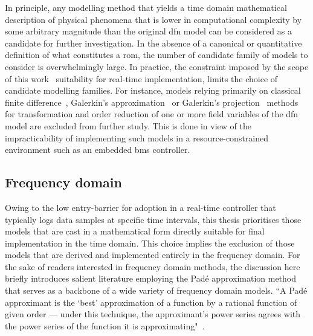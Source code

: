 \addlines[-0.5]
In  principle, any  modelling  method  that yields  a  time domain  mathematical
description  of physical  phenomena that  is lower  in computational  complexity
by  some  arbitrary   magnitude  than  the  original  \gls{dfn}   model  can  be
considered  as  a  candidate  for  further  investigation.  In  the  absence  of
a  canonical  or  quantitative  definition  of  what  constitutes  a  \gls{rom},
the  number  of  candidate  family  of  models  to  consider  is  overwhelmingly
large.  In  practice,  the  constraint  imposed   by  the  scope  of  this  work
\ie~suitability  for real-time  implementation, limits  the choice  of candidate
modelling  families.  For  instance,   models  relying  primarily  on  classical
finite  difference~\cite{Smith2006}, Galerkin's  approximation~\cite{Dao2012} or
Galerkin's  projection~\cite{Fan2016,Fan2018}  methods  for  transformation  and
order  reduction of  one or  more  field variables  of the  \gls{dfn} model  are
excluded from  further study. This  is done in  view of the  impracticability of
implementing  such  models in  a  resource-constrained  environment such  as  an
embedded \gls{bms} controller.

\subsection{Frequency   domain   }\label{subsec:freqdomainroms}

Owing  to the  low entry-barrier  for adoption  in a  real-time controller  that
typically logs data samples at  specific time intervals, this thesis prioritises
those models  that are cast in  a mathematical form directly  suitable for final
implementation in  the time domain. This  choice implies the exclusion  of those
models that  are derived and implemented  entirely in the frequency  domain. For
the sake of readers interested in  frequency domain methods, the discussion here
briefly introduces  salient literature  employing the Padé  approximation method
that serves as a backbone of a wide variety of frequency domain models. ``A Padé
approximant is the `best' approximation of a function by a rational function of
given order --- under this technique, the approximant's power series agrees with
the power series of the function it is approximating"~\cite{padewiki}.


